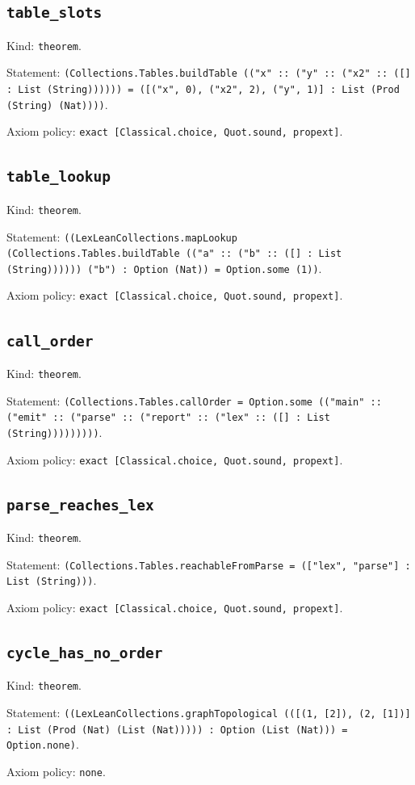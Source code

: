 \documentclass[11pt]{article}
\begin{document}
\subsection*{\texttt{table\_slots}}
\noindent Kind: \texttt{theorem}.\par
\noindent Statement: \texttt{(Collections.Tables.buildTable (("x" :: ("y" :: ("x2" :: ([] : List (String)))))) = ([("x", 0), ("x2", 2), ("y", 1)] : List (Prod (String) (Nat))))}.\par
\noindent Axiom policy: \texttt{exact [Classical.choice, Quot.sound, propext]}.\par
\subsection*{\texttt{table\_lookup}}
\noindent Kind: \texttt{theorem}.\par
\noindent Statement: \texttt{((LexLeanCollections.mapLookup (Collections.Tables.buildTable (("a" :: ("b" :: ([] : List (String)))))) ("b") : Option (Nat)) = Option.some (1))}.\par
\noindent Axiom policy: \texttt{exact [Classical.choice, Quot.sound, propext]}.\par
\subsection*{\texttt{call\_order}}
\noindent Kind: \texttt{theorem}.\par
\noindent Statement: \texttt{(Collections.Tables.callOrder = Option.some (("main" :: ("emit" :: ("parse" :: ("report" :: ("lex" :: ([] : List (String)))))))))}.\par
\noindent Axiom policy: \texttt{exact [Classical.choice, Quot.sound, propext]}.\par
\subsection*{\texttt{parse\_reaches\_lex}}
\noindent Kind: \texttt{theorem}.\par
\noindent Statement: \texttt{(Collections.Tables.reachableFromParse = (["lex", "parse"] : List (String)))}.\par
\noindent Axiom policy: \texttt{exact [Classical.choice, Quot.sound, propext]}.\par
\subsection*{\texttt{cycle\_has\_no\_order}}
\noindent Kind: \texttt{theorem}.\par
\noindent Statement: \texttt{((LexLeanCollections.graphTopological (([(1, [2]), (2, [1])] : List (Prod (Nat) (List (Nat))))) : Option (List (Nat))) = Option.none)}.\par
\noindent Axiom policy: \texttt{none}.\par
\end{document}
